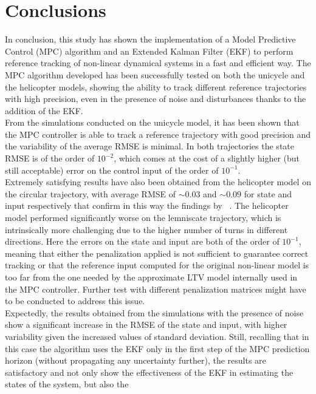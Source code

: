 \documentclass[../main.tex]{subfiles}
\begin{document}
\section{Conclusions}\label{sec:conclusions}

In conclusion, this study has shown the implementation of a Model Predictive
Control (MPC) algorithm and an Extended Kalman Filter (EKF) to perform reference
tracking of non-linear dynamical systems in a fast and efficient way.
The MPC algorithm developed has been successfully tested on both the unicycle
and the helicopter models, showing the ability to track different reference
trajectories with high precision, even in the presence of noise and
disturbances thanks to the addition of the EKF.\\
From the simulations conducted on the unicycle model, it has been shown that the
MPC controller is able to track a reference trajectory with good precision
and the variability of the average RMSE is minimal. In both trajectories the state RMSE is of the order of $10^{-2}$, which comes at
the cost of a slightly higher (but still acceptable) error on the control input of the order of $10^{-1}$.\\
Extremely satisfying results
have also been obtained from the helicopter model on the circular trajectory,
with average RMSE of $\sim 0.03$ and $\sim 0.09$ for state and input
respectively that confirm in this way the findings by ~\cite{helicopter}. The helicopter model performed significantly worse
on the lemniscate trajectory, which is intrinsically more challenging due to the 
higher number of turns in different directions. Here the errors on the state and
input are both of the order of $10^{-1}$, meaning that either the penalization
applied is not sufficient to guarantee correct tracking or that the reference
input computed for the original non-linear model is too far from the one needed by
the approximate LTV model internally used in the MPC controller. Further test
with different penalization matrices might have to be conducted to address this
issue.\\
Expectedly, the results obtained from the simulations with the presence of noise
show a significant increase in the RMSE of the state and input, with 
higher variability given the increased values of standard deviation. Still,
recalling that in this case the algorithm uses the EKF 
only in the first step of the MPC prediction horizon (without propagating any
uncertainty further), the results are satisfactory and not only show the
effectiveness of the EKF in estimating the states of the system, but also the
\end{document}
